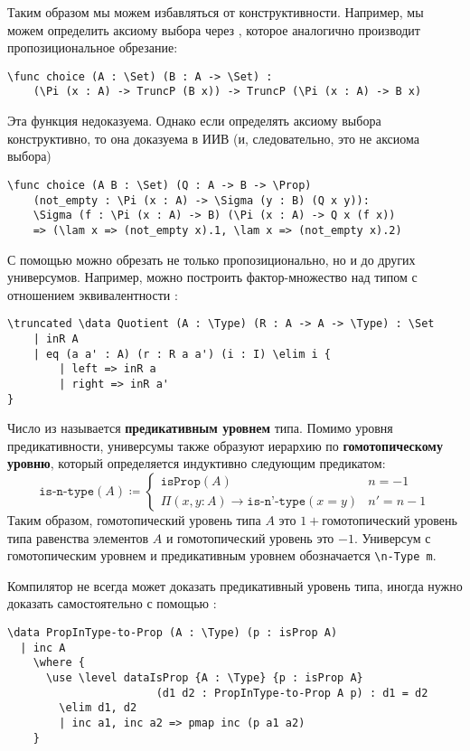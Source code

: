 Таким образом мы можем избавляться от конструктивности. Например, мы можем определить аксиому выбора через , которое аналогично \ard{\truncated} производит пропозициональное обрезание:

\begin{verbatim}
\func choice (A : \Set) (B : A -> \Set) :
    (\Pi (x : A) -> TruncP (B x)) -> TruncP (\Pi (x : A) -> B x)
\end{verbatim}

Эта функция недоказуема. Однако если определять аксиому выбора конструктивно, то она доказуема в ИИВ (и, следовательно, это не аксиома выбора)
\begin{verbatim}
\func choice (A B : \Set) (Q : A -> B -> \Prop)
    (not_empty : \Pi (x : A) -> \Sigma (y : B) (Q x y)):
    \Sigma (f : \Pi (x : A) -> B) (\Pi (x : A) -> Q x (f x))
    => (\lam x => (not_empty x).1, \lam x => (not_empty x).2)
\end{verbatim}

С помощью \ard{\truncated} можно обрезать не только пропозиционально, но и до других универсумов. Например, можно построить фактор-множество над типом  с отношением эквивалентности :
\begin{verbatim}
\truncated \data Quotient (A : \Type) (R : A -> A -> \Type) : \Set
    | inR A
    | eq (a a' : A) (r : R a a') (i : I) \elim i {
        | left => inR a
        | right => inR a'
}
\end{verbatim}

Число  из  называется \textbf{предикативным уровнем} типа. Помимо уровня предикативности, универсумы также образуют иерархию по \textbf{гомотопическому уровню}, который определяется индуктивно следующим предикатом:
\[
    \texttt{is-n-type}(A) \coloneqq \begin{cases}
        \texttt{isProp}(A) & n = - 1 \\
        \Pi (x, y : A) \to \texttt{is-n'-type}(x = y) & n' = n - 1
    \end{cases}
\]
Таким образом, гомотопический уровень типа $A$ это $1 +{}$гомотопический уровень типа равенства элементов $A$ и гомотопический уровень \ard{\Prop} это $-1$. Универсум с гомотопическим уровнем  и предикативным уровнем  обозначается \texttt{\textbackslash{}n-Type m}.

Компилятор не всегда может доказать предикативный уровень типа, иногда нужно доказать самостоятельно с помощью \ard{\use \level}:
\begin{verbatim}
\data PropInType-to-Prop (A : \Type) (p : isProp A)
  | inc A
    \where {
      \use \level dataIsProp {A : \Type} {p : isProp A} 
                       (d1 d2 : PropInType-to-Prop A p) : d1 = d2
        \elim d1, d2
        | inc a1, inc a2 => pmap inc (p a1 a2)
    }
\end{verbatim} 

